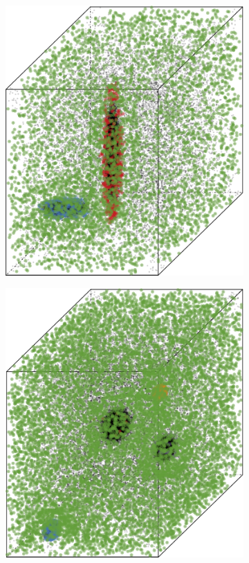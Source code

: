 \begin{figure}
\begin{subfigure}{0.23\textwidth}
				\includegraphics[keepaspectratio=true, width=\textwidth, height=0.23\textheight]{discussion/img/baakman_2_60000_anisotropy.png}
				\caption{}
				\label{fig:discussion:anisotropy:baakman2}
			\end{subfigure}
			\subfigvspace
			\begin{subfigure}{0.23\textwidth}
				\centering
				\includegraphics[keepaspectratio=true, width=\textwidth, height=0.23\textheight]{discussion/img/ferdosi_3_120000_anisotropy.png}

\end{subfigure}
\end{figure}

